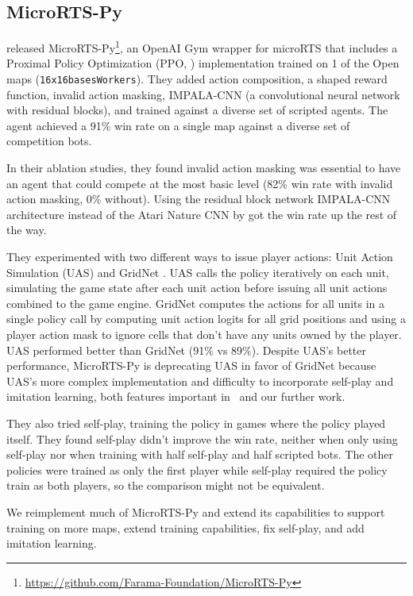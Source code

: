 \documentclass{article}
\begin{document}
\subsection{MicroRTS-Py}
\citet{DBLP:journals/corr/abs-2105-13807} released MicroRTS-Py\footnote{\url{https://github.com/Farama-Foundation/MicroRTS-Py}}, an OpenAI Gym
wrapper for microRTS that includes a Proximal Policy Optimization (PPO, \citet{DBLP:journals/corr/SchulmanWDRK17}) implementation
trained on 1 of the Open maps (\texttt{16x16basesWorkers}). They added action composition, a shaped reward function, invalid action
masking, IMPALA-CNN (a convolutional neural network with residual blocks), and trained
against a diverse set of scripted agents. The agent achieved a
91\% win rate on a single map against a diverse set of competition bots.

In their ablation studies, they found invalid action masking was essential to have an agent that could compete at
the most basic level (82\% win rate with invalid action masking, 0\% without). Using the
residual block network IMPALA-CNN architecture instead of the Atari Nature CNN by
\citet{DBLP:journals/corr/MnihKSGAWR13} got the win rate up the rest of the way.

They experimented with two different ways to issue player actions: Unit Action Simulation (UAS)
and GridNet \citep{pmlr-v97-han19a}. UAS calls the policy iteratively on each unit, simulating the game state
after each unit action before issuing all unit actions combined to the game engine. GridNet
computes the actions for all units in a single policy call by computing unit action
logits for all grid positions and using a player action mask to ignore cells that don't
have any units owned by the player. UAS performed better than GridNet (91\% vs 89\%).
Despite UAS's better performance, MicroRTS-Py is deprecating UAS in favor of GridNet
because UAS's more complex implementation and difficulty to incorporate self-play and
imitation learning, both features important in \agentName\ and our further work.

They also tried self-play, training the policy in games where the policy played itself. 
They found self-play didn't improve the win rate,
neither when only using self-play nor when training with half self-play and half scripted
bots. The other policies were trained as only the first player while self-play required
the policy train as both players, so the comparison might not be equivalent.

We reimplement much of MicroRTS-Py and extend its capabilities to support training on
more maps, extend training capabilities, fix self-play, and add imitation learning.
\end{document}
